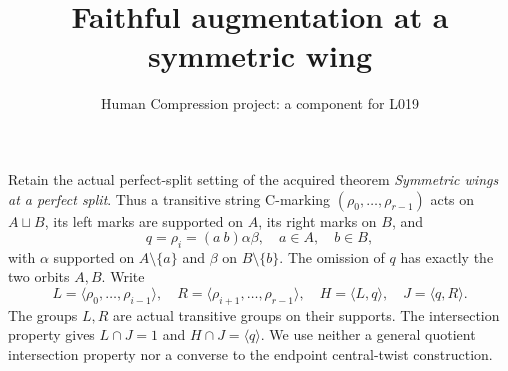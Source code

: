 \documentclass[11pt,a4paper]{article}
\title{Faithful augmentation at a symmetric wing}
\author{Human Compression project: a component for L019}
\date{}
\newcommand{\gen}[1]{\langle#1\rangle}
\begin{document}
\maketitle
Retain the actual perfect-split setting of the acquired theorem
\emph{Symmetric wings at a perfect split}. Thus a transitive string
C-marking $(\rho_0,\ldots,\rho_{r-1})$ acts on $A\sqcup B$,
its left marks are supported on $A$, its right marks on $B$, and
\[
 q=\rho_i=(a\ b)\alpha\beta,
 \quad a\in A,\quad b\in B,
\]
with $\alpha$ supported on $A\setminus\{a\}$ and $\beta$ on
$B\setminus\{b\}$. The omission of $q$ has exactly the two
orbits $A,B$. Write
\[
 L=\gen{\rho_0,\ldots,\rho_{i-1}},\quad
 R=\gen{\rho_{i+1},\ldots,\rho_{r-1}},\quad
 H=\gen{L,q},\quad J=\gen{q,R}.
\]
The groups $L,R$ are actual transitive groups on their supports.
The intersection property gives $L\cap J=1$ and $H\cap J=\gen q$.
We use neither a general quotient intersection property nor a
converse to the endpoint central-twist construction.
\end{document}
